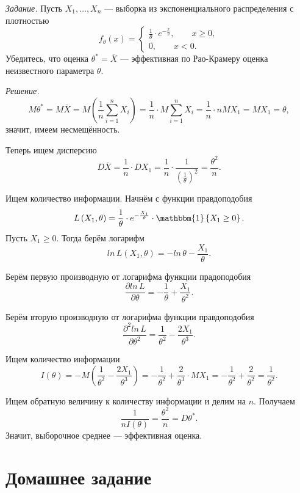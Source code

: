\textit{Задание.}
Пусть $X_1, \dotsc, X_n$ --- выборка из экспоненциального распределения с плотностью
$$f_{ \theta } \left( x \right) =
  \begin{cases}
    \frac{1}{ \theta } \cdot e^{- \frac{x}{ \theta }}, \qquad x \geq 0, \\
    0, \qquad x < 0.
  \end{cases}$$
Убедитесь, что оценка $ \theta^* = \overline{X}$ ---
эффективная по Рао-Крамеру оценка неизвестного параметра $ \theta $.

\textit{Решение.}
$$M \theta^* =
  M \overline{X} =
  M \left( \frac{1}{n} \sum \limits_{i = 1}^n X_i \right) =
  \frac{1}{n} \cdot M \sum \limits_{i = 1}^n X_i =
  \frac{1}{n} \cdot nMX_1 =
  MX_1 =
  \theta,$$
значит, имеем несмещённость.

Теперь ищем дисперсию
$$D \overline{X} =
  \frac{1}{n} \cdot DX_1 =
  \frac{1}{n} \cdot \frac{1}{ \left( \frac{1}{ \theta } \right)^2} =
  \frac{ \theta^2}{n}.$$

Ищем количество информации.
Начнём с функции правдоподобия
$$L \left( X_1, \theta \right) =
  \frac{1}{ \theta } \cdot e^{- \frac{X_1}{ \theta }} \cdot
  \mathbbm{1} \left\{ X_1 \geq 0 \right\}.$$
Пусть $X_1 \geq 0$.
Тогда берём логарифм
$$ln \, L \left( X_1, \theta \right) =
  - ln \, \theta - \frac{X_1}{ \theta }.$$

Берём первую производную от логарифма функции прадоподобия
$$ \frac{ \partial ln \, L}{ \partial \theta } =
  - \frac{1}{ \theta } + \frac{X_1}{ \theta^2}.$$

Берём вторую производную от логарифма функции правдоподобия
$$ \frac{ \partial ^2 ln \, L}{ \partial \theta^2} =
  \frac{1}{ \theta^2} - \frac{2X_1}{ \theta^3}.$$

Ищем количество информации
$$I \left( \theta \right) =
  -M \left( \frac{1}{ \theta^2} - \frac{2X_1}{ \theta^3} \right) =
  - \frac{1}{ \theta^2} + \frac{2}{ \theta^3} \cdot MX_1 =
  - \frac{1}{ \theta^2} + \frac{2}{ \theta^2} =
  \frac{1}{ \theta^2}.$$

Ищем обратную величину к количеству информации и делим на $n$.
Получаем
$$ \frac{1}{nI \left( \theta \right) } =
  \frac{ \theta^2}{n} =
  D \theta^*.$$
Значит, выборочное среднее --- эффективная оценка.

\section*{Домашнее задание}

